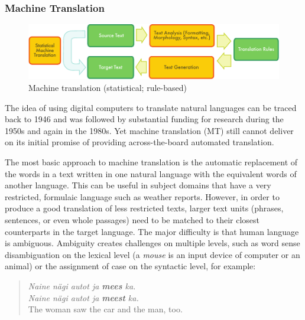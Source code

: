 \documentclass[]{../metanetpaper}
\begin{document}
\begin{multicols}{2}
\subsubsection{Machine Translation}

\begin{figure}[htb]
  \center
  \includegraphics[width=\textwidth]{../_media/english/machine_translation}
  \caption{Machine translation (statistical; rule-based)}
  \label{fig:mtarch_en}
\end{figure}

The idea of using digital computers to translate natural languages can be traced back to 1946 and was followed by substantial funding for research during the 1950s and again in the 1980s. 
Yet machine translation (MT) still cannot deliver on its initial promise of providing across-the-board automated translation.  


The most basic approach to machine translation is the automatic replacement of the words in a text written in one natural language with the equivalent words of another language. This can be useful in subject domains that have a very restricted, formulaic language such as weather reports.
However, in order to produce a good translation of less restricted texts, larger text units (phrases, sentences, or even whole passages) need to be matched to their closest counterparts in the target language. The major difficulty is that human language is ambiguous. Ambiguity creates challenges on multiple levels, such as word sense disambiguation on the lexical level (a \textit{mouse} is an input device of computer or an animal) or the assignment of case on the syntactic level, for example:

\begin{quote}
\textit{Naine nägi autot ja \textbf{mees} ka.}\\
\textit{Naine nägi autot ja \textbf{meest} ka.}\\
The woman saw the car and the man, too.
\end{quote}


\end{multicols}
\end{document}
